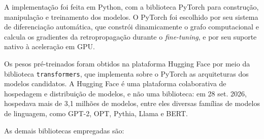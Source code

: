 A implementação foi feita em Python, com a biblioteca PyTorch para
construção, manipulação e treinamento dos modelos. O PyTorch foi escolhido por seu sistema
de diferenciação automática, que constrói dinamicamente o grafo computacional e calcula os
gradientes da retropropagação durante o \textit{fine-tuning}, e por seu suporte nativo à
aceleração em GPU.

Os pesos pré-treinados foram obtidos na plataforma Hugging Face por meio da biblioteca
\texttt{transformers}, que implementa sobre o PyTorch as arquiteturas dos
modelos candidatos. A Hugging Face é uma plataforma colaborativa de hospedagem e
distribuição de modelos, e não uma biblioteca: em 28 set. 2026, hospedava mais de 3,1
milhões de modelos, entre eles diversas famílias de modelos de linguagem, como GPT-2, OPT,
Pythia, Llama e BERT.

As demais bibliotecas empregadas são:


